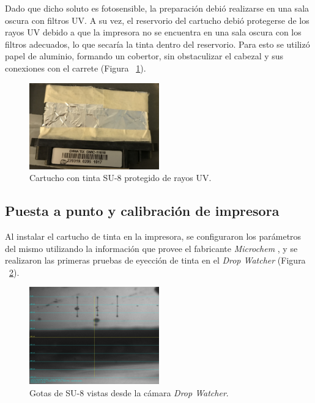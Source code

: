 Dado que dicho soluto es fotosensible, la preparación debió realizarse en una sala oscura con filtros UV. A su vez, el reservorio del cartucho debió protegerse de los rayos UV debido a que la impresora no se encuentra en una sala oscura con los filtros adecuados, lo que secaría la tinta dentro del reservorio. Para esto se utilizó papel de aluminio, formando un cobertor, sin obstaculizar el cabezal y sus conexiones con el carrete (Figura ~\ref{fig:Figura_cartucho_SU8}).

\begin{figure}[H]
  \centering
    \includegraphics[width=0.5\textwidth]{Figuras/Figura_cartucho_SU8}
  \caption{Cartucho con tinta SU-8 protegido de rayos UV.}
  \label{fig:Figura_cartucho_SU8}
\end{figure}

\subsection{Puesta a punto y calibraci\'on de impresora}
Al instalar el cartucho de tinta en la impresora, se configuraron los parámetros del mismo utilizando la información que provee el fabricante \textit{Microchem} \cite{PriElexSU8}, y se realizaron las primeras pruebas de eyección de tinta en el \textit{Drop Watcher} (Figura ~\ref{fig:Figura_Drop_Watcher_SU8}).

\begin{figure}[H]
  \centering
    \includegraphics[width=0.5\textwidth]{Figuras/Figura_Drop_Watcher_SU8}
  \caption{Gotas de SU-8 vistas desde la cámara \textit{Drop Watcher}.}
  \label{fig:Figura_Drop_Watcher_SU8}
\end{figure}

